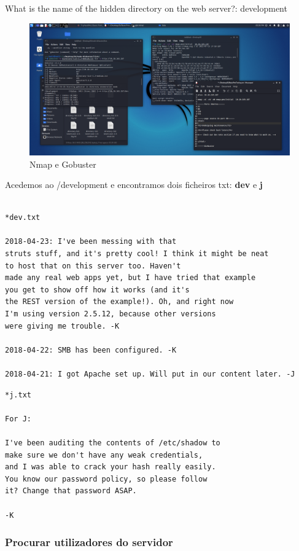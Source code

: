 \documentclass[11pt]{article}
\begin{document}
What is the name of the hidden directory on the web server?: development

\begin{figure}[h]
    \includegraphics[width=1\textwidth]{imgs/Screenshot_2021-07-13_17_56_27.png}
    \centering
    \caption{Nmap e Gobuster}
\end{figure}

\newpage

Acedemos ao /development e encontramos dois ficheiros txt: \textbf{dev} e \textbf{j}
\begin{verbatim}

*dev.txt

2018-04-23: I've been messing with that 
struts stuff, and it's pretty cool! I think it might be neat
to host that on this server too. Haven't 
made any real web apps yet, but I have tried that example
you get to show off how it works (and it's 
the REST version of the example!). Oh, and right now 
I'm using version 2.5.12, because other versions
were giving me trouble. -K

2018-04-22: SMB has been configured. -K

2018-04-21: I got Apache set up. Will put in our content later. -J
\end{verbatim}

\begin{verbatim}
*j.txt

For J:

I've been auditing the contents of /etc/shadow to 
make sure we don't have any weak credentials,
and I was able to crack your hash really easily. 
You know our password policy, so please follow
it? Change that password ASAP.

-K
\end{verbatim}

\subsubsection{Procurar utilizadores do servidor}
\end{document}
